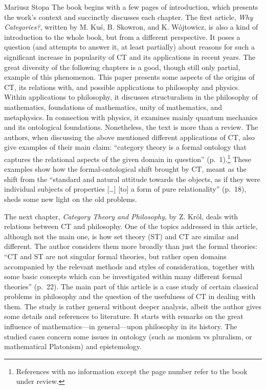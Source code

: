 \begin{recengenv}{Mariusz Stopa}
The book begins with a few pages of introduction, which presents the work's context and succinctly discusses each chapter. The first article, \textit{Why Cat\-e\-gories?}, written by M. Kuś, B. Skowron, and K. Wójtowicz, is also a kind of introduction to the whole book, but from a different perspective. It poses a question (and attempts to answer it, at least partially) about reasons for such a significant increase in popularity of CT and its applications in recent years. The great diversity of the following chapters is a good, though still only partial, example of this phenomenon. This paper presents some aspects of the origins of CT, its relations with, and possible applications to philosophy and physics. Within applications to philosophy, it discusses structuralism in the philosophy of mathematics, foundations of mathematics, unity of mathematics, and metaphysics. In connection with physics, it examines mainly quantum mechanics and its ontological foundations. Nonetheless, the text is more than a review. The authors, when discussing the above mentioned different applications of CT, also give examples of their main claim: ``cat\-e\-go\-ry theory is a formal ontology that captures the relational aspects of the given domain in question'' (p.~1).\footnote{References with no information except the page number refer to the book under review.} These examples show how the formal-ontological shift brought by CT, meant as the shift from the ``standard and natural attitude towards the objects, as if they were individual subjects of properties [\ldots] [to] a form of pure relationality'' (p.~18), sheds some new light on the old problems.


The next chapter, \textit{Category Theory and Philosophy}, by Z. Król, deals with relations between CT and philosophy. One of the topics addressed in this article, although not the main one, is how set theory (ST) and CT are similar and different. The author considers them more broadly than just the formal theories: ``CT and ST are not singular formal theories, but rather open domains accompanied by the relevant methods and styles of consideration, together with some basic concepts which can be investigated within many different formal theories'' (p.~22). The main part of this article is a case study of certain classical problems in philosophy and the question of the usefulness of CT in dealing with them. The study is rather general without deeper analysis, albeit the author gives some details and references to literature. It starts with remarks on the great influence of mathematics---in general---upon philosophy in its history. The studied cases concern some issues in ontology (such as monism vs pluralism, or mathematical Platonism) and epistemology.


\end{recengenv}
